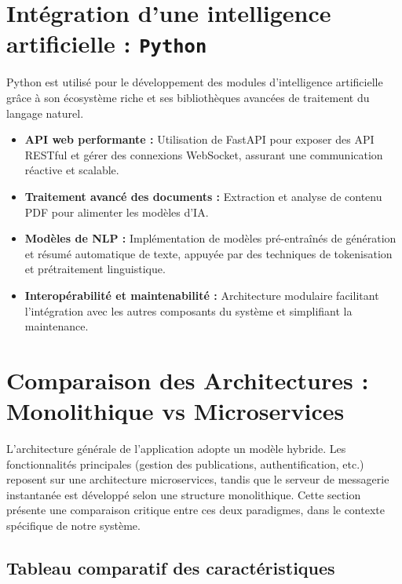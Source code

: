 \documentclass{rapportPfe}
\begin{document}
\newpage
\section{Intégration d'une intelligence artificielle : \texttt{Python}}

Python est utilisé pour le développement des modules d’intelligence artificielle grâce à son écosystème riche et ses bibliothèques avancées de traitement du langage naturel.

\begin{itemize}
    \item \textbf{API web performante :} Utilisation de FastAPI pour exposer des API RESTful et gérer des connexions WebSocket, assurant une communication réactive et scalable.
    \item \textbf{Traitement avancé des documents :} Extraction et analyse de contenu PDF pour alimenter les modèles d’IA.
    \item \textbf{Modèles de NLP :} Implémentation de modèles pré-entraînés de génération et résumé automatique de texte, appuyée par des techniques de tokenisation et prétraitement linguistique.
    \item \textbf{Interopérabilité et maintenabilité :} Architecture modulaire facilitant l’intégration avec les autres composants du système et simplifiant la maintenance.
\end{itemize}

\section{Comparaison des Architectures : Monolithique vs Microservices}

L’architecture générale de l’application adopte un modèle hybride. Les fonctionnalités principales (gestion des publications, authentification, etc.) reposent sur une architecture microservices, tandis que le serveur de messagerie instantanée est développé selon une structure monolithique. Cette section présente une comparaison critique entre ces deux paradigmes, dans le contexte spécifique de notre système.

\subsection{Tableau comparatif des caractéristiques}
\end{document}

